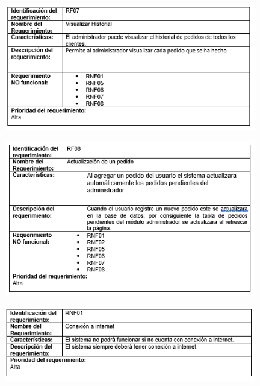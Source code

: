 \newpage


\begin{figure}[htb]
\begin{center}
\includegraphics[width=11cm]{./imagenes/tablas/RF07.png}
\end{center}

\end{figure}



\begin{figure}[htb]
\begin{center}
\includegraphics[width=11cm]{./imagenes/tablas/RF08.png}
\end{center}

\end{figure}

\newpage



\begin{figure}[htb]
\begin{center}
\includegraphics[width=11cm]{./imagenes/tablas/RNF01.png}
\end{center}

\end{figure}




